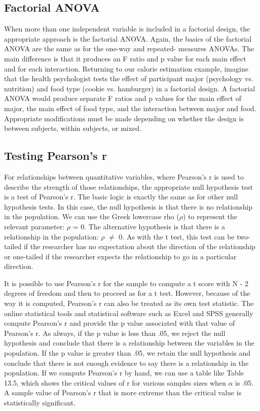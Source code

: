 \subsection{Factorial ANOVA}

When more than one independent variable is included in a factorial design, the appropriate approach is the factorial ANOVA. Again, the basics of the factorial ANOVA are the same as for the one-way and repeated- measures ANOVAs. The main difference is that it produces an F ratio and p value for each main effect and for each interaction. Returning to our calorie estimation example, imagine that the health psychologist tests the effect of participant major (psychology vs. nutrition) and food type (cookie vs. hamburger) in a factorial design. A factorial ANOVA would produce separate F ratios and p values for the main effect of major, the main effect of food type, and the interaction between major and food. Appropriate modifications must be made depending on whether the design is between subjects, within subjects, or mixed.


\subsection{Testing Pearson's r}


For relationships between quantitative variables, where Pearson's r is used to describe the strength of those relationships, the appropriate null hypothesis test is a test of Pearson's r. The basic logic is exactly the same as for other null hypothesis tests. In this case, the null hypothesis is that there is no relationship in the population. We can use the Greek lowercase rho ($\rho$) to represent the relevant parameter: $\rho$ = 0. The alternative hypothesis is that
there is a relationship in the population: $\rho$ $\neq$ 0. As with the t test, this test can be two-tailed if the researcher has no expectation about the direction of the relationship or one-tailed if the researcher expects the relationship to go in a particular direction.


It is possible to use Pearson's r for the sample to compute a t score with N - 2 degrees of freedom and then to proceed as for a t test. However, because of the way it is computed, Pearson's r can also be treated as its own test statistic. The online statistical tools and statistical software such as Excel and SPSS generally compute Pearson's r and provide the p value associated with that value of Pearson's r. As always, if the p value is less than .05, we reject the null hypothesis and conclude that there is a relationship between the variables in the population. If the p value is greater than .05, we retain the null hypothesis and conclude that there is not enough evidence to say there is a relationship in the population. If we compute Pearson's r by hand, we can use a table like Table 13.5, which shows the critical values of r for various samples sizes when $\alpha$ is .05. A sample value of Pearson's r that is more extreme than the critical value is statistically significant.


